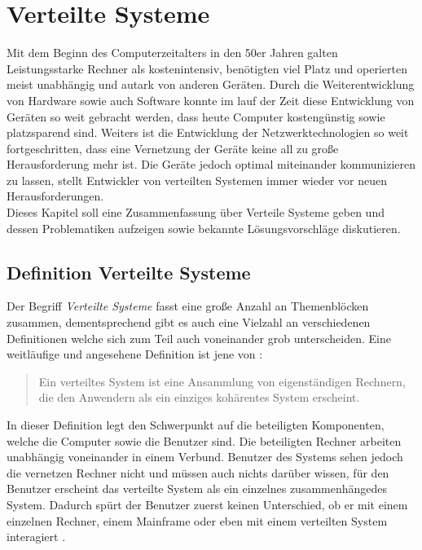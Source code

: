 \chapter{Verteilte Systeme}\label{cha:distributedSystems}
Mit dem Beginn des Computerzeitalters in den 50er Jahren galten Leistungsstarke Rechner als kostenintensiv, benötigten viel Platz und operierten meist unabhängig und autark von anderen Geräten. Durch die Weiterentwicklung von Hardware sowie auch Software konnte im lauf der Zeit diese Entwicklung von Geräten so weit gebracht werden, dass heute Computer kostengünstig sowie platzsparend sind. Weiters ist die Entwicklung der Netzwerktechnologien so weit fortgeschritten, dass eine Vernetzung der Geräte keine all zu große Herausforderung mehr ist. Die Geräte jedoch optimal miteinander kommunizieren zu lassen, stellt Entwickler von verteilten Systemen immer wieder vor neuen Herausforderungen. \citep{tanenbaum2007distributed} \\
Dieses Kapitel soll eine Zusammenfassung über Verteile Systeme geben und dessen Problematiken aufzeigen sowie  bekannte Lösungsvorschläge diskutieren.

\section{Definition Verteilte Systeme}\label{sec:distributedSystems:definition}
Der Begriff \textit{Verteilte Systeme} fasst eine große Anzahl an Themenblöcken zusammen, dementsprechend gibt es auch eine Vielzahl an verschiedenen Definitionen welche sich zum Teil auch voneinander grob unterscheiden. Eine weitläufige und angesehene Definition ist jene von \cite{tanenbaum2007distributed}:
\begin{quote}
    Ein verteiltes System ist eine Ansammlung von eigenständigen Rechnern, die den Anwendern als ein einziges kohärentes System erscheint.
    \label{quote:distributedSystem:tanenbaum}
\end{quote}
In dieser Definition legt \cite{tanenbaum2007distributed} den Schwerpunkt auf die beteiligten Komponenten, welche die Computer sowie die Benutzer sind. Die beteiligten Rechner arbeiten unabhängig voneinander in einem Verbund. Benutzer des Systems sehen jedoch die vernetzen Rechner nicht und müssen auch nichts darüber wissen, für den Benutzer erscheint das verteilte System als ein einzelnes zusammenhängedes System. Dadurch spürt der Benutzer zuerst keinen Unterschied, ob er mit einem einzelnen Rechner, einem Mainframe oder eben mit einem verteilten System interagiert \citep{tanenbaum2007distributed}. \\

